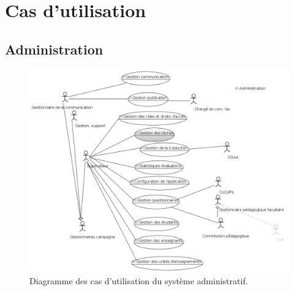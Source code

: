 \documentclass[a4paper,11pt]{report}
\begin{document}















\chapter{Cas d'utilisation}

\section{Administration}

\begin{figure}[ht]
\includegraphics[width=\linewidth]{workspace/evalens-usecases/administration.png}
\caption{Diagramme des cas d'utilisation du système administratif.}
\label{fig:usecase-admin}
\end{figure}
\end{document}
